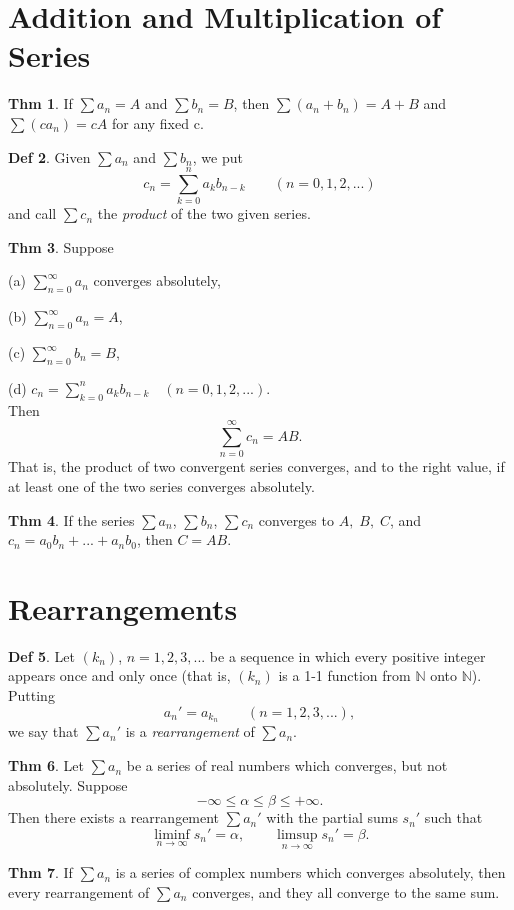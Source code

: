 \documentclass{article}
\theoremstyle{definition}
\newtheorem{definition}{Def}
\newtheorem{theorem}[definition]{Thm}
\begin{document}
\section{Addition and Multiplication of Series}
\begin{theorem}
    If $\sum a_n = A$ and $\sum b_n=B$, then $\sum(a_n+b_n)=A+B$ and $\sum(ca_n)=cA$ for any fixed c.
\end{theorem}
\begin{definition}
    Given $\sum a_n$ and $\sum b_n$, we put
    \[
    c_n=\sum_{k=0}^n a_kb_{n-k}\qquad (n=0,1,2,...)
    \]
    and call $\sum c_n$ the \textit{product} of the two given series.
\end{definition}
\begin{theorem}
    Suppose\par
    (a) $\sum_{n=0}^\infty a_n$ converges absolutely,\par
    (b) $\sum_{n=0}^\infty a_n=A$,\par
    (c) $\sum_{n=0}^\infty b_n=B$,\par
    (d) $c_n=\sum_{k=0}^na_kb_{n-k}\quad(n=0,1,2,...)$.\\
    Then
    \[
    \sum_{n=0}^\infty c_n=AB.
    \]
    That is, the product of two convergent series converges, and to the right value, if at least one of the two series converges absolutely.
\end{theorem}
\begin{theorem}
    If the series $\sum a_n$, $\sum b_n$, $\sum c_n$ converges to $A,\;B,\;C$, and $c_n=a_0b_n+...+a_nb_0$, then $C=AB$.
\end{theorem}

\section{Rearrangements}
\begin{definition}
    Let $(k_n)$, $n=1,2,3,...$ be a sequence in which every positive integer appears once and only once (that is, $(k_n)$ is a 1-1 function from $\mathbb{N}$ onto $\mathbb{N}$). Putting
    \[
    a_n'=a_{k_n}\qquad (n=1,2,3,...),
    \]
    we say that $\sum a_n'$ is a \textit{rearrangement} of $\sum a_n$.
\end{definition}
\begin{theorem}
    Let $\sum a_n$ be a series of real numbers which converges, but not absolutely. Suppose
    \[
    -\infty\leq\alpha\leq\beta\leq+\infty.
    \]
    Then there exists a rearrangement $\sum a_n'$ with the partial sums $s_n'$ such that
    \[
    \liminf_{n\to\infty} s_n'=\alpha,\qquad\limsup_{n\to\infty} s_n'=\beta.
    \]
\end{theorem}
\begin{theorem}
    If $\sum a_n$ is a series of complex numbers which converges absolutely, then every rearrangement of $\sum a_n$ converges, and they all converge to the same sum.
\end{theorem}
\end{document}

